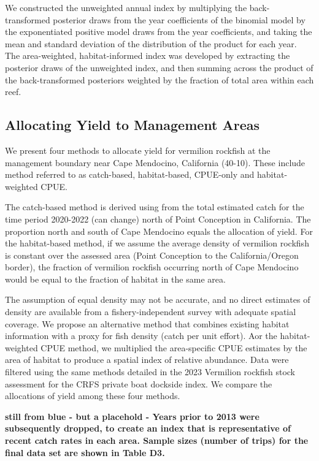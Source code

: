 \documentclass[
  12pt,
  authoryear,
  preprint,
  3p]{elsarticle}
\begin{document}
We constructed the unweighted annual index by multiplying the
back-transformed posterior draws from the year coefficients of the
binomial model by the exponentiated positive model draws from the year
coefficients, and taking the mean and standard deviation of the
distribution of the product for each year. The area-weighted,
habitat-informed index was developed by extracting the posterior draws
of the unweighted index, and then summing across the product of the
back-transformed posteriors weighted by the fraction of total area
within each reef.

\hypertarget{allocating-yield-to-management-areas}{%
\subsection{Allocating Yield to Management
Areas}\label{allocating-yield-to-management-areas}}

We present four methods to allocate yield for vermilion rockfish at the
management boundary near Cape Mendocino, California (40-10). These
include method referred to as catch-based, habitat-based, CPUE-only and
habitat-weighted CPUE.

The catch-based method is derived using from the total estimated catch
for the time period 2020-2022 (can change) north of Point Conception in
California. The proportion north and south of Cape Mendocino equals the
allocation of yield. For the habitat-based method, if we assume the
average density of vermilion rockfish is constant over the assessed area
(Point Conception to the California/Oregon border), the fraction of
vermilion rockfish occurring north of Cape Mendocino would be equal to
the fraction of habitat in the same area.

The assumption of equal density may not be accurate, and no direct
estimates of density are available from a fishery-independent survey
with adequate spatial coverage. We propose an alternative method that
combines existing habitat information with a proxy for fish density
(catch per unit effort). Aor the habitat-weighted CPUE method, we
multiplied the area-specific CPUE estimates by the area of habitat to
produce a spatial index of relative abundance. Data were filtered using
the same methods detailed in the 2023 Vermilion rockfish stock
assessment for the CRFS private boat dockside index. We compare the
allocations of yield among these four methods.

\textbf{still from blue - but a placehold - Years prior to 2013 were
subsequently dropped, to create an index that is representative of
recent catch rates in each area. Sample sizes (number of trips) for the
final data set are shown in Table D3. }
\end{document}
